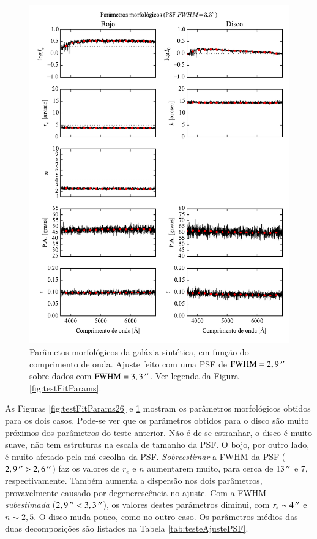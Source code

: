 \begin{figure}
	\includegraphics{figuras/simulation_fitparams_psf33}
	\caption[Parâmetos morfológicos (teste com PSF $\mathrm{FWHM} = 3,3\,\arcs$).]
	{Parâmetos morfológicos da galáxia sintética, em função do comprimento de
	onda. Ajuste feito com uma PSF de $\mathrm{FWHM} = 2,9\,^{\prime\prime}$ sobre
	dados com $\mathrm{FWHM} = 3,3\,\arcs$. Ver legenda da Figura
	\ref{fig:testFitParams}.}
	\label{fig:testFitParams33}
\end{figure}

As Figuras \ref{fig:testFitParams26} e \ref{fig:testFitParams33} mostram os
parâmetros morfológicos obtidos para os dois casos. Pode-se ver que os
parâmetros obtidos para o disco são muito próximos dos parâmetros do teste
anterior. Não é de se estranhar, o disco é muito suave, não tem estruturas na
escala de tamanho da PSF. O bojo, por outro lado, é muito afetado pela má
escolha da PSF. {\em Sobreestimar} a FWHM da PSF ($2,9\,^{\prime\prime} > 2,6\,^{\prime\prime}$) faz
os valores de $r_e$ e $n$ aumentarem muito, para cerca de $13\,^{\prime\prime}$ e $7$,
respectivamente. Também aumenta a dispersão nos dois parâmetros, provavelmente
causado por degenerescência no ajuste. Com a FWHM {\em subestimada} ($2,9\,^{\prime\prime}
< 3,3\,^{\prime\prime}$), os valores destes parâmetros diminui, com $r_e \sim 4\,^{\prime\prime}$ e
$n \sim 2,5$. O disco muda pouco, como no outro caso. Os parâmetros médios das
duas decomposições são listados na Tabela \ref{tab:testeAjustePSF}.

